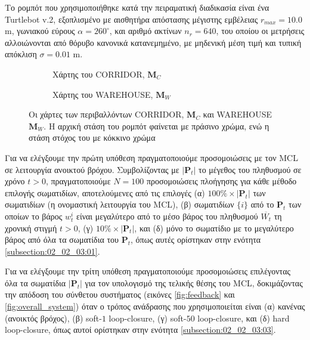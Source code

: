 Το ρομπότ που χρησιμοποιήθηκε κατά την πειραματική διαδικασία είναι ένα
Turtlebot v.2, εξοπλισμένο με αισθητήρα απόστασης μέγιστης εμβέλειας
$r_{max} = 10.0$ m, γωνιακού εύρους $\alpha = 260^{\circ}$, και αριθμό ακτίνων
$n_r = 640$, του οποίου οι μετρήσεις αλλοιώνονται από θόρυβο κανονικά
κατανεμημένο, με μηδενική μέση τιμή και τυπική απόκλιση $\sigma = 0.01$ m.

\begin{figure}\hspace{0.5cm}
  \begin{subfigure}{0.49\linewidth}\centering
    \vspace{1.0cm}
    
    \vspace{1.0cm}
    \caption{\small Χάρτης του CORRIDOR, $\bm{M}_C$}
    \label{fig:02_02_04:map_corridor}
  \end{subfigure}\hfill
  \begin{subfigure}{0.49\linewidth} \centering
    
    \vspace{0.25cm}
    \caption{\small Χάρτης του WAREHOUSE, $\bm{M}_W$}
    \label{fig:02_02_04:map_warehouse}
  \end{subfigure}
  \caption{\small Οι χάρτες των περιβαλλόντων CORRIDOR, $\bm{M}_C$ και
           WAREHOUSE $\bm{M}_W$. Η αρχική στάση του ρομπότ φαίνεται με πράσινο
           χρώμα, ενώ η στάση στόχος του με κόκκινο χρώμα}
\label{fig:02_02_04:maps}
\end{figure}

Για να ελέγξουμε την πρώτη υπόθεση πραγματοποιούμε προσομοιώσεις με τον MCL σε
λειτουργία ανοικτού βρόχου. Συμβολίζοντας με $|\bm{P}_t|$ το μέγεθος του
πληθυσμού σε χρόνο $t>0$, πραγματοποιούμε $N=100$ προσομοιώσεις πλοήγησης για
κάθε μέθοδο επιλογής σωματιδίων, αποτελούμενες από τις επιλογές (α) $100\%
\times |\bm{P}_t|$ των σωματιδίων (η ονομαστική λειτουργία του MCL), (β)
σωματιδίων $\{i\}$ από το $\bm{P}_t$ των οποίων το βάρος $w_t^i$ είναι
μεγαλύτερο από το μέσο βάρος του πληθυσμού $\overline{W_t}$ τη χρονική στιγμή
$t>0$, (γ) $10\% \times |\bm{P}_t|$, και (δ) μόνο το σωματίδιο με το μεγαλύτερο
βάρος από όλα τα σωματίδια του $\bm{P}_t$, όπως αυτές ορίστηκαν στην ενότητα
\ref{subsection:02_02_03:01}.

Για να ελέγξουμε την τρίτη υπόθεση πραγματοποιούμε προσομοιώσεις επιλέγοντας
όλα τα σωματίδια $|\bm{P}_t|$ για τον υπολογισμό της τελικής θέσης του MCL,
δοκιμάζοντας την απόδοση του σύνθετου συστήματος (εικόνες \ref{fig:feedback} και
\ref{fig:overall_system}) όταν ο τρόπος ανάδρασης που
χρησιμοποιείται είναι (α) κανένας (ανοικτός βρόχος), (β) soft-$1$ loop-closure,
(γ) soft-$50$ loop-closure, και (δ) hard loop-closure, όπως αυτοί ορίστηκαν
στην ενότητα \ref{subsection:02_02_03:03}.

